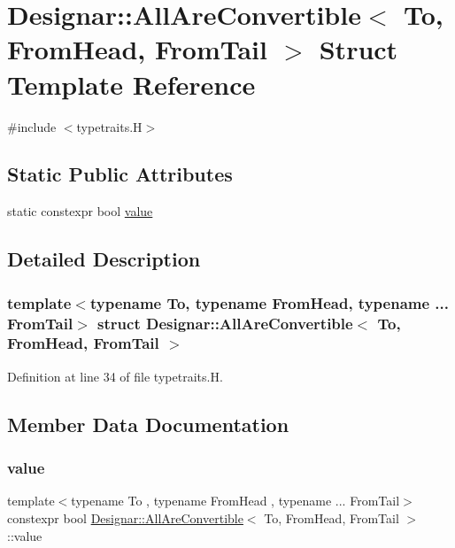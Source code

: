 \hypertarget{struct_designar_1_1_all_are_convertible}{}\section{Designar\+:\+:All\+Are\+Convertible$<$ To, From\+Head, From\+Tail $>$ Struct Template Reference}
\label{struct_designar_1_1_all_are_convertible}


{\ttfamily \#include $<$typetraits.\+H$>$}

\subsection*{Static Public Attributes}
\begin{DoxyCompactItemize}
\item 
static constexpr bool \hyperlink{struct_designar_1_1_all_are_convertible_a698b71c73875452298bc2e96935240c3}{value}
\end{DoxyCompactItemize}


\subsection{Detailed Description}
\subsubsection*{template$<$typename To, typename From\+Head, typename ... From\+Tail$>$\newline
struct Designar\+::\+All\+Are\+Convertible$<$ To, From\+Head, From\+Tail $>$}



Definition at line 34 of file typetraits.\+H.



\subsection{Member Data Documentation}
\mbox{\label{struct_designar_1_1_all_are_convertible_a698b71c73875452298bc2e96935240c3}} 
\subsubsection{\texorpdfstring{value}{value}}
{\footnotesize\ttfamily template$<$typename To , typename From\+Head , typename ... From\+Tail$>$ \\
constexpr bool \hyperlink{struct_designar_1_1_all_are_convertible}{Designar\+::\+All\+Are\+Convertible}$<$ To, From\+Head, From\+Tail $>$\+::value\hspace{0.3cm}{\ttfamily [static]}}

